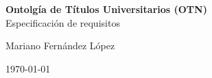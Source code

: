 \begin{titlepage}

\vspace*{\fill}
\begin{center}

    {\huge \textbf{Ontolgía de Títulos Universitarios (OTN)}}
    \\{\LARGE Especificación de requisitos}
\vspace{3cm}

{\Large Mariano Fern\'andez L\'opez\\}

{\Large \today}
\end{center}

\vspace*{\fill}

\end{titlepage}
\setcounter{page}{1}
